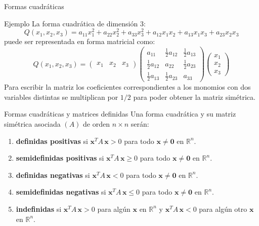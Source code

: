 \documentclass[10pt,aspectratio=169]{beamer}  %
\begin{document}
%
\begin{frame}{Formas cuadráticas}
\begin{exampleblock}{Ejemplo}
La forma cuadrática de dimensión $3$:
%
\begin{equation*}
	Q(x_1, x_2, x_3) = a_{11} x_1^2 + a_{22} x_2^2 + a_{33} x_3^2 + a_{12} x_1 x_2 +  a_{13} x_1 x_3 + a_{23} x_2 x_3
\end{equation*}
%
puede ser representada en forma matricial como:
%
\begin{equation*}
	Q(x_1, x_2, x_3) = \begin{pmatrix}
		x_1 & x_2 & x_3
	\end{pmatrix} \begin{pmatrix}
		a_{11} & \frac{1}{2} a_{12} & \frac{1}{2} a_{13} \\
		\frac{1}{2} a_{12} & a_{22} & \frac{1}{2} a_{23} \\
		\frac{1}{2} a_{13} & \frac{1}{2} a_{23} & a_{33}
	\end{pmatrix}\begin{pmatrix}
		x_1 \\ x_2 \\ x_3
	\end{pmatrix}
\end{equation*}
%
Para escribir la matriz los coeficientes correspondientes a los monomios con dos variables distintas
se multiplican por $1/2$ para poder obtener la matriz simétrica.

\end{exampleblock}
\end{frame}


%
\begin{frame}{Formas cuadráticas y matrices definidas}
Una forma cuadrática y su matriz simétrica asociada $(A)$ de orden $n \times n$ serán:
%
\begin{enumerate}[label=(\alph*)]
	\item \textbf{definidas positivas} si $\mathbf{x}^T A \,\mathbf{x} > 0$ para todo $\mathbf{x} \neq \mathbf{0}$ en $\mathbb{R}^n$.
	\item \textbf{semidefinidas positivas}  si $\mathbf{x}^T A \,\mathbf{x} \geq 0$ para todo $\mathbf{x} \neq \mathbf{0}$ en $\mathbb{R}^n$.
	\item \textbf{definidas negativas} si $\mathbf{x}^T A \,\mathbf{x} < 0$ para todo $\mathbf{x} \neq \mathbf{0}$ en $\mathbb{R}^n$.
	\item \textbf{semidefinidas negativas}  si $\mathbf{x}^T A \,\mathbf{x} \leq 0$ para todo $\mathbf{x} \neq \mathbf{0}$ en $\mathbb{R}^n$.
	\item \textbf{indefinidas} si $\mathbf{x}^T A \,\mathbf{x} > 0$ para algún $\mathbf{x}$  en $\mathbb{R}^n$ y 
	$\mathbf{x}^T A \,\mathbf{x} < 0$ para algún otro $\mathbf{x}$  en $\mathbb{R}^n$.
\end{enumerate}
%

\end{frame}
\end{document}
